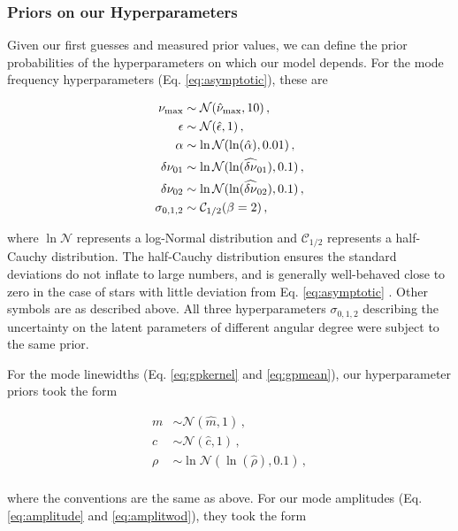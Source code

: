 \subsubsection{Priors on our Hyperparameters}
Given our first guesses and measured prior values, we can define the prior probabilities of the hyperparameters on which our model depends. For the mode frequency hyperparameters (Eq. \ref{eq:asymptotic}), these are

\begin{equation}
	\begin{split}
		\mbox{$\nu_{\rm max}$} &\sim \mathcal{N}(\hat{\nu}_{\rm max}, 10)\, ,\\
		\epsilon &\sim \mathcal{N}(\hat{\epsilon}, 1)\, ,\\
		\alpha &\sim \ln\mathcal{N}(\ln(\hat{\alpha}), 0.01)\, ,\\
		\delta\nu_{01} &\sim \ln\mathcal{N}(\ln(\widehat{\delta\nu}_{01}), 0.1)\, ,\\
		\delta\nu_{02} &\sim \ln\mathcal{N}(\ln(\widehat{\delta\nu}_{02}), 0.1)\, ,\\
		\sigma_{0,1,2} &\sim \mathcal{C}_{1/2}(\beta = 2)\, ,
	\end{split}
\end{equation}

\noindent where $\ln\mathcal{N}$ represents a log-Normal distribution and $\mathcal{C}_{1/2}$ represents a half-Cauchy distribution. The half-Cauchy distribution ensures the standard deviations do not inflate to large numbers, and is generally well-behaved close to zero in the case of stars with little deviation from Eq. \ref{eq:asymptotic} \cite{gelman2006}. Other symbols are as described above. All three hyperparameters $\sigma_{0,1,2}$ describing the uncertainty on the latent parameters of different angular degree were subject to the same prior.

For the mode linewidths (Eq. \ref{eq:gpkernel} and \ref{eq:gpmean}), our hyperparameter priors took the form

\begin{equation}
	\begin{split}
		m &\sim \mathcal{N}(\hat{m}, 1)\, ,\\
		c &\sim \mathcal{N}(\hat{c}, 1)\, ,\\
		\rho &\sim \ln\mathcal{N}(\ln(\hat{\rho}), 0.1)\, ,\\
	\end{split}
\end{equation}

\noindent where the conventions are the same as above. For our mode amplitudes (Eq. \ref{eq:amplitude} and \ref{eq:amplitwod}), they took the form

